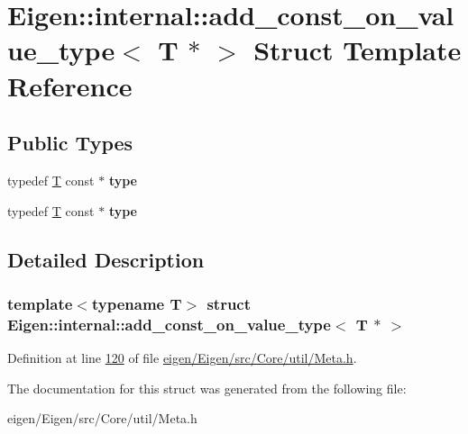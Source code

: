 \hypertarget{struct_eigen_1_1internal_1_1add__const__on__value__type_3_01_t_01_5_01_4}{}\section{Eigen\+:\+:internal\+:\+:add\+\_\+const\+\_\+on\+\_\+value\+\_\+type$<$ T $\ast$ $>$ Struct Template Reference}
\label{struct_eigen_1_1internal_1_1add__const__on__value__type_3_01_t_01_5_01_4}
\subsection*{Public Types}
\begin{DoxyCompactItemize}
\item 
\mbox{\label{struct_eigen_1_1internal_1_1add__const__on__value__type_3_01_t_01_5_01_4_a0f7ec490e2155fad880fc9725396de5b}} 
typedef \hyperlink{group___sparse_core___module}{T} const  $\ast$ {\bfseries type}
\item 
\mbox{\label{struct_eigen_1_1internal_1_1add__const__on__value__type_3_01_t_01_5_01_4_a0f7ec490e2155fad880fc9725396de5b}} 
typedef \hyperlink{group___sparse_core___module}{T} const  $\ast$ {\bfseries type}
\end{DoxyCompactItemize}


\subsection{Detailed Description}
\subsubsection*{template$<$typename T$>$\newline
struct Eigen\+::internal\+::add\+\_\+const\+\_\+on\+\_\+value\+\_\+type$<$ T $\ast$ $>$}



Definition at line \hyperlink{eigen_2_eigen_2src_2_core_2util_2_meta_8h_source_l00120}{120} of file \hyperlink{eigen_2_eigen_2src_2_core_2util_2_meta_8h_source}{eigen/\+Eigen/src/\+Core/util/\+Meta.\+h}.



The documentation for this struct was generated from the following file\+:\begin{DoxyCompactItemize}
\item 
eigen/\+Eigen/src/\+Core/util/\+Meta.\+h\end{DoxyCompactItemize}
